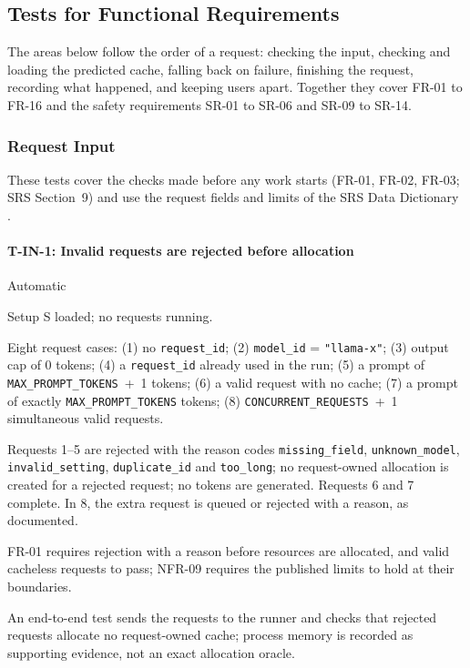 \documentclass[12pt, titlepage]{article}
\newenvironment{testcase}[2]
  {\Needspace{8\baselineskip}\paragraph{#1: #2}\phantomsection\label{test:#1}\sloppy
   \begin{description}[style=sameline, leftmargin=3.6cm, labelwidth=3.4cm,
     font=\normalfont\bfseries, itemsep=2pt, topsep=2pt]}
  {\end{description}}
\newcommand{\cst}[1]{\texttt{#1}}
\begin{document}
\subsection{Tests for Functional Requirements}

The areas below follow the order of a request: checking the input,
checking and loading the predicted cache, falling back on failure,
finishing the request, recording what happened, and keeping users apart.
Together they cover FR-01 to FR-16 and the safety requirements SR-01 to
SR-06 and SR-09 to SR-14.

\subsubsection{Request Input}

These tests cover the checks made before any work starts (FR-01, FR-02,
FR-03; SRS Section~9) and use the request fields and limits of the SRS
Data Dictionary \citep[Section~7.2]{TandemSRS}.

\begin{testcase}{T-IN-1}{Invalid requests are rejected before allocation}
\item[Control] Automatic
\item[Initial state] Setup S loaded; no requests running.
\item[Input] Eight request cases: (1) no \texttt{request\_id}; (2)
\texttt{model\_id} = \texttt{"llama-x"}; (3) output cap of 0 tokens; (4) a
\texttt{request\_id} already used in the run; (5) a prompt of
\cst{MAX\_PROMPT\_TOKENS}~+~1 tokens; (6) a valid request with no cache;
(7) a prompt of exactly \cst{MAX\_PROMPT\_TOKENS} tokens; (8)
\cst{CONCURRENT\_REQUESTS}~+~1 simultaneous valid requests.
\item[Output] Requests 1--5 are rejected with the reason codes
\texttt{missing\_field}, \texttt{unknown\_model}, \texttt{invalid\_setting},
\texttt{duplicate\_id} and \texttt{too\_long}; no request-owned allocation is created
for a rejected request; no tokens are generated.
Requests 6 and 7 complete. In 8, the extra request is queued or rejected
with a reason, as documented.
\item[Derivation] FR-01 requires rejection with a reason before resources
are allocated, and valid cacheless requests to pass; NFR-09 requires the
published limits to hold at their boundaries.
\item[How performed] An end-to-end test sends the requests to the runner and
checks that rejected requests allocate no request-owned cache; process
memory is recorded as supporting evidence, not an exact allocation oracle.
\end{testcase}
\end{document}
